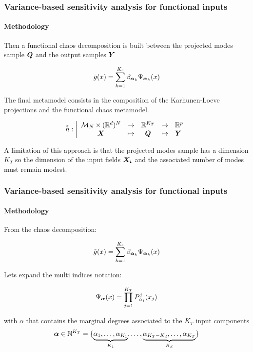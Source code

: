 \documentclass[aspectratio=169]{beamer}
\begin{document}
\begin{frame}
\frametitle{Variance-based sensitivity analysis for functional inputs}

\framesubtitle{Methodology}

Then a functional chaos decomposition is built between the projected modes\\
sample ${{\mathbf{\boldsymbol{{{\mathbf{\boldsymbol{{Q}}}}}}}}}$ and the output samples ${{\mathbf{\boldsymbol{{{\mathbf{\boldsymbol{{Y}}}}}}}}}$

$$
\tilde{g}(x) = \sum_{k=1}^{K_c} \beta_{{\mathbf{\boldsymbol{{\alpha}}}}_k} \Psi_{{\mathbf{\boldsymbol{{\alpha}}}}_k}(x)
$$

The final metamodel consists in the composition of the Karhunen-Loeve
projections and the functional chaos metamodel.

$$
    \tilde{h}: \left|
      \begin{array}{ccccl}
         {\mathcal M}_N \times (\mathbb{R}^d)^N & \rightarrow & \mathbb{R}^{K_T} & \rightarrow & \mathbb{R}^p \\
         {{\mathbf{\boldsymbol{{{\mathbf{\boldsymbol{{X}}}}}}}}} & \mapsto & {\mathbf{\boldsymbol{{Q}}}} & \mapsto & {\mathbf{\boldsymbol{{Y}}}}
      \end{array}
    \right.
$$

A limitation of this approach is that the projected modes sample has a dimension
$K_T$ so the dimension of the input fields ${{\mathbf{\boldsymbol{{{\mathbf{\boldsymbol{{X_i}}}}}}}}}$
and the associated number of modes must remain modest.

\end{frame}


\begin{frame}
\frametitle{Variance-based sensitivity analysis for functional inputs}

\framesubtitle{Methodology}

From the chaos decomposition:

$$
\tilde{g}(x) = \sum_{k=1}^{K_c} \beta_{{\mathbf{\boldsymbol{{\alpha}}}}_k} \Psi_{{\mathbf{\boldsymbol{{\alpha}}}}_k}(x)
$$

Lets expand the multi indices notation:

$$
    \Psi_{{\mathbf{\boldsymbol{{\alpha}}}}}(x) = \prod_{j=1}^{K_T} P^j_{\alpha_j}(x_j)
$$

with $\alpha$ that contains the marginal degrees associated to the $K_T$ input components
$$
    {\mathbf{\boldsymbol{{\alpha}}}} \in \mathbb{N}^{K_T} = \{\underbrace{\alpha_1, \dots, \alpha_{K_1}}_{K_1},\dots,\underbrace{\alpha_{K_T-K_d}, \dots, \alpha_{K_T}}_{K_d}\}
$$

\end{frame}
\end{document}
